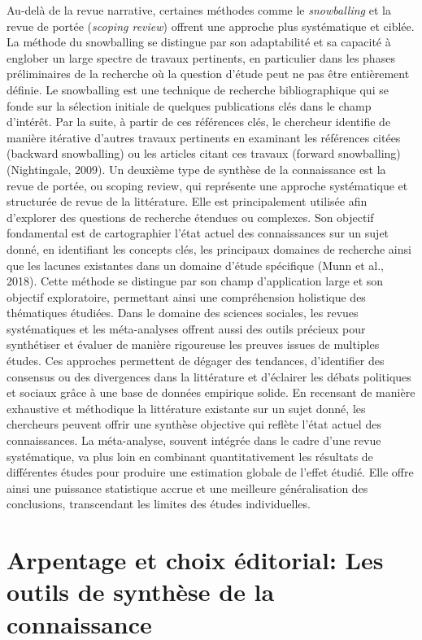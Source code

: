 \documentclass[
  letterpaper,
  DIV=11,
  numbers=noendperiod]{scrreprt}
\begin{document}
Au-delà de la revue narrative, certaines méthodes comme le
\emph{snowballing} et la revue de portée (\emph{scoping review}) offrent
une approche plus systématique et ciblée. La méthode du snowballing se
distingue par son adaptabilité et sa capacité à englober un large
spectre de travaux pertinents, en particulier dans les phases
préliminaires de la recherche où la question d'étude peut ne pas être
entièrement définie. Le snowballing est une technique de recherche
bibliographique qui se fonde sur la sélection initiale de quelques
publications clés dans le champ d'intérêt. Par la suite, à partir de ces
références clés, le chercheur identifie de manière itérative d'autres
travaux pertinents en examinant les références citées (backward
snowballing) ou les articles citant ces travaux (forward snowballing)
(Nightingale, 2009). Un deuxième type de synthèse de la connaissance est
la revue de portée, ou scoping review, qui représente une approche
systématique et structurée de revue de la littérature. Elle est
principalement utilisée afin d'explorer des questions de recherche
étendues ou complexes. Son objectif fondamental est de cartographier
l'état actuel des connaissances sur un sujet donné, en identifiant les
concepts clés, les principaux domaines de recherche ainsi que les
lacunes existantes dans un domaine d'étude spécifique (Munn et al.,
2018). Cette méthode se distingue par son champ d'application large et
son objectif exploratoire, permettant ainsi une compréhension holistique
des thématiques étudiées. Dans le domaine des sciences sociales, les
revues systématiques et les méta-analyses offrent aussi des outils
précieux pour synthétiser et évaluer de manière rigoureuse les preuves
issues de multiples études. Ces approches permettent de dégager des
tendances, d'identifier des consensus ou des divergences dans la
littérature et d'éclairer les débats politiques et sociaux grâce à une
base de données empirique solide. En recensant de manière exhaustive et
méthodique la littérature existante sur un sujet donné, les chercheurs
peuvent offrir une synthèse objective qui reflète l'état actuel des
connaissances. La méta-analyse, souvent intégrée dans le cadre d'une
revue systématique, va plus loin en combinant quantitativement les
résultats de différentes études pour produire une estimation globale de
l'effet étudié. Elle offre ainsi une puissance statistique accrue et une
meilleure généralisation des conclusions, transcendant les limites des
études individuelles.

\hypertarget{arpentage-et-choix-uxe9ditorial-les-outils-de-synthuxe8se-de-la-connaissance}{%
\section{Arpentage et choix éditorial: Les outils de synthèse de la
connaissance}\label{arpentage-et-choix-uxe9ditorial-les-outils-de-synthuxe8se-de-la-connaissance}}
\end{document}
